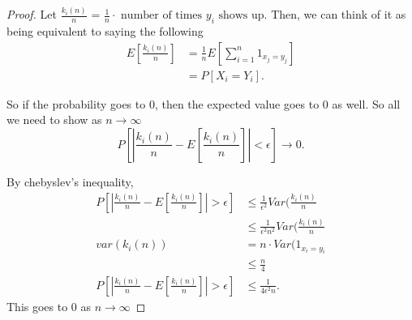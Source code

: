 \documentclass[a4paper]{article}
\begin{document}
  \begin{proof}
    Let $\frac{k_i(n)}{n}$ = $\frac{1}{n} \cdot \text{ number of times $y_i$ shows up}$. Then, we can think of it as being equivalent to saying the following
    \begin{align*}
      E[\frac{k_i(n)}{n}] &= \frac{1}{n} E[\sum_{i=1}^{n} 1_{x_j = y_j}] \\
                          &= P[X_i = Y_i] 
    .\end{align*}

    So if the probability goes to 0, then the expected value goes to 0 as well. So all we need to show as $n \to \infty$
    \[
      P[|\frac{k_i(n)}{n} - E[\frac{k_i(n)}{n}]| < \epsilon] \to 0 
    .\] 

    By chebyslev's inequality,
    \begin{align*}
      P[|\frac{k_i(n)}{n} - E[\frac{k_i(n)}{n}]| > \epsilon] &\leq \frac{1}{\epsilon^{2}} Var(\frac{k_i(n)}{n} \\
                                                             &\leq \frac{1}{\epsilon^{2}n^{2}} Var(\frac{k_i(n)}{n}\\
      var(k_i(n)) &= n \cdot Var(1_{x_i = y_i} \\
                  &\leq \frac{n}{4} \\
      P[|\frac{k_i(n)}{n} - E[\frac{k_i(n)}{n}]| > \epsilon] &\leq \frac{1}{4\epsilon^{2}n} 
    .\end{align*}
    This goes to $0$ as  $n \to \infty$
  \end{proof}
\end{document}
